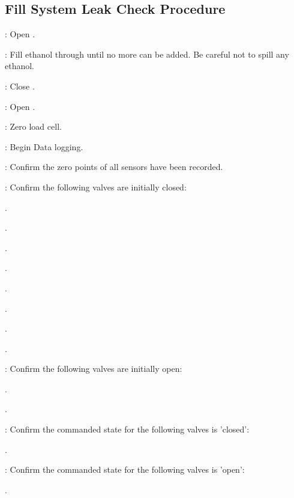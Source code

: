 \subsection{Fill System Leak Check Procedure}
\begin{checklist}
    \item \primary{}: Open \fdrain{}. 
    \item \primary{}: Fill ethanol through \fdrain{} until no more can be added. Be careful not to spill any ethanol. 
    \item \primary{}: Close \fdrain{}.
    \item \primary{}: Open \fiso{}.
    \item \daq{}: Zero load cell. 
    \item \daq{}: Begin Data logging. 
    \item \daq{}: Confirm the zero points of all sensors have been recorded. 
    \item \primary{}: Confirm the following valves are initially closed:
    \begin{checklist}
        \item \oxfill{}. 
        \item \moxfill{}.
        \item \oxdrain{}.
        \item \moxdrain{}. 
        \item \ohshit{}.
        \item \purge{}.
        \item \fdrain{}.
        \item \pdrain{}.
    \end{checklist}
    \item \primary{}: Confirm the following valves are initially open:
    \begin{checklist}
        \item \fiso{}.
        \item \oxiso{}.
    \end{checklist}
    \item \rlcs{}: Confirm the commanded state for the following valves is 'closed':
    \begin{checklist}
        \item \inj{}.
    \end{checklist}
    \item \rlcs{}: Confirm the commanded state for the following valves is 'open':
    \begin{checklist}
        \item \vent{}.

\end{checklist}
\end{checklist}
